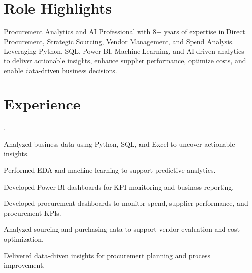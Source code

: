 \documentclass[]{deedy-resume-reversed}
\begin{document}

\begin{minipage}[t]{0.65\textwidth}



\section{Role Highlights}

Procurement Analytics and AI Professional with 8+ years of expertise in Direct Procurement, Strategic Sourcing, Vendor Management, and Spend Analysis. Leveraging Python, SQL, Power BI, Machine Learning, and AI-driven analytics to deliver actionable insights, enhance supplier performance, optimize costs, and enable data-driven business decisions.
\sectionsep


\section{Experience}

.
\begin{tightemize}
\item Analyzed business data using Python, SQL, and Excel to uncover actionable insights.
\item Performed EDA and machine learning to support predictive analytics.
\item Developed Power BI dashboards for KPI monitoring and business reporting.
\end{tightemize}

\sectionsep


\begin{tightemize}
\item Developed procurement dashboards to monitor spend, supplier performance, and procurement KPIs.
\item Analyzed sourcing and purchasing data to support vendor evaluation and cost optimization.
\item Delivered data-driven insights for procurement planning and process improvement.
\end{tightemize}



\end{minipage}
\end{document}
